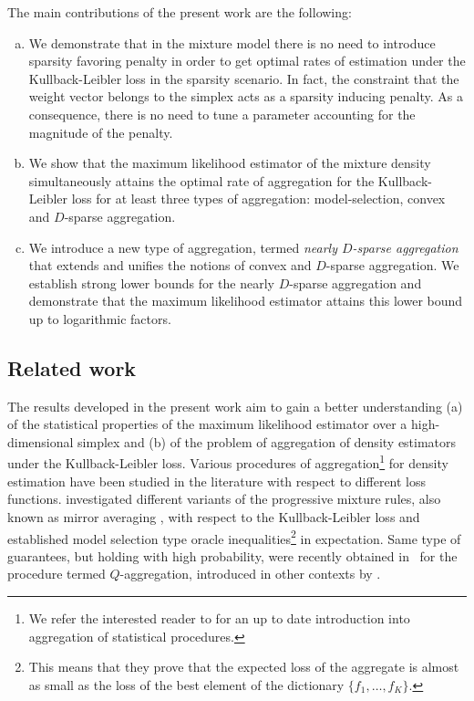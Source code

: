The main contributions of the present work are the following:
\begin{enumerate}[(a)]
	\item We demonstrate that in the mixture model there is no need to introduce sparsity favoring penalty in order to
	get optimal rates of estimation under the Kullback-Leibler loss in the sparsity scenario. In fact, the constraint
	that the weight vector belongs to the simplex acts as a sparsity inducing penalty. As a consequence, there is no
	need to tune a parameter accounting for the magnitude of the penalty.
	\item We show that the maximum likelihood estimator of the mixture density simultaneously attains the optimal rate
	of aggregation for the Kullback-Leibler loss for at least three types of aggregation: model-selection, convex and
	$D$-sparse aggregation.
	\item We introduce a new type of aggregation, termed \textit{nearly $D$-sparse aggregation} that extends and unifies
	the notions of convex and $D$-sparse aggregation. We establish strong lower bounds for the nearly $D$-sparse aggregation
	and demonstrate that the maximum likelihood estimator attains this lower bound up to logarithmic factors.
\end{enumerate}

\subsection{Related work}\label{ssec:rel_work}

The results developed in the present work aim to gain a better understanding (a) of the statistical properties of the
maximum likelihood estimator over a high-dimensional simplex and (b) of the problem of aggregation of density estimators
under the Kullback-Leibler loss. Various procedures of aggregation\footnote{We refer the interested reader to \citep{TsybICM}
	for an up to date introduction into aggregation of statistical procedures.} for density estimation have been studied in the literature
with respect to different loss functions. \citep{Catoni97,Yang2000,JRT} investigated different variants of the progressive
mixture rules, also known as mirror averaging \citep{YNTV,DT12a}, with respect to the Kullback-Leibler loss and established
model selection type oracle inequalities\footnote{This means that they prove that the expected loss of the aggregate is
	almost as small as the loss of the best element of the dictionary $\{f_1,\ldots,f_K\}$.} in expectation. Same type of guarantees,
but holding with high probability, were recently obtained in~\citep{Bellec2014,Butucea1} for the procedure termed $Q$-aggregation,
introduced in other contexts by \citep{Dai,Rigollet12}.

